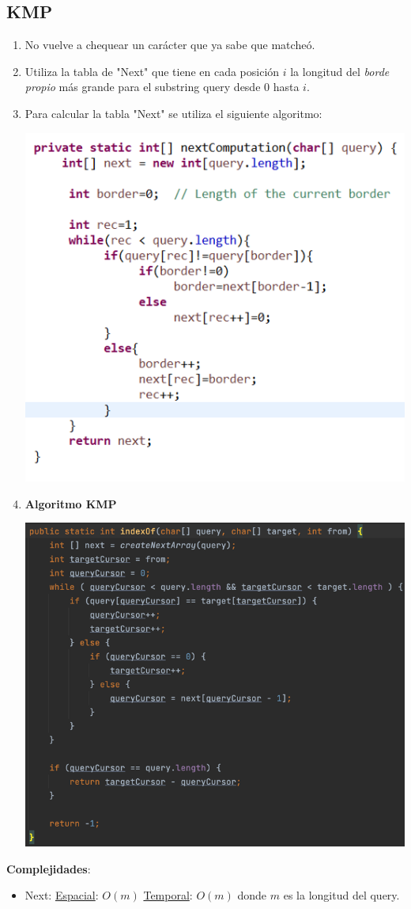 \documentclass{article}
\begin{document}
\subsection{KMP}
\begin{enumerate}
    \item No vuelve a chequear un carácter que ya sabe que matcheó.
    \item Utiliza la tabla de "Next" que tiene en cada posición $i$ la longitud del \emph{borde propio} más grande para el substring query desde 0 hasta $i$.
    \item Para calcular la tabla "Next" se utiliza el siguiente algoritmo:
    \begin{center}
        \includegraphics[width=.50\textwidth]{Images/AlgNext.png}
    \end{center}
    \item \textbf{Algoritmo KMP}
        \begin{center}
        \includegraphics[width=.50\textwidth]{Images/KMPAlgoritmo.png}
    \end{center}
\end{enumerate}
\textbf{Complejidades}:
\begin{itemize}
    \item Next:
    \subitem \underline{Espacial}: $O(m)$
    \subitem \underline{Temporal}: $O(m)$
    donde $m$ es la longitud del query.
\end{itemize}
\end{document}
